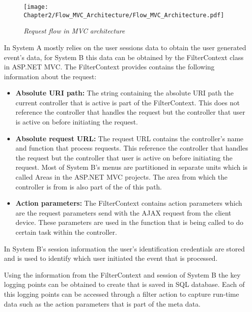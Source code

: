 \begin{figure}[!htb] %
	\centering %
	\texttt{[image: Chapter2/Flow\_MVC\_Architecture/Flow\_MVC\_Architecture.pdf]}
	\caption[Request flow in MVC architecture]
	{\textit{Request flow in MVC architecture \cite{Gu2010}}}\label{fig:ch2_Flow_MVC_Architecture}
\end{figure}

In  System A mostly relies on the user sessions data to obtain the user generated event's data, for System B this data can be obtained by the FilterContext class in ASP.NET MVC. The FilterContext provides contains the following information about the request:

\begin{itemize}
	\item \textbf{Absolute URI path:} The string containing the absolute URI path the current controller that is active is part of the FilterContext. This does not reference the controller that handles the request but the controller that user is active on before initiating the request. 
	\item \textbf{Absolute request URL:} The request URL contains the controller's name and function that process requests. This reference the controller that handles the request but the controller that user is active on before initiating the request. Most of System B's menus are partitioned in separate units which is called Areas in the ASP.NET MVC projects. The area from which the controller is from is also part of the of this path.
	\item \textbf{Action parameters:} The FilterContext contains action parameters which are the request parameters send with the AJAX request from the client device. These parameters are used in the function that is being called to do certain task within the controller.
\end{itemize}

In System B's session information the user's identification credentials are stored and is used to identify which user initiated the event that is processed.

\clearpage

Using the information from the FilterContext and session of System B the key logging points can be obtained to create  that is saved in SQL database. Each of this logging points can be accessed through a filter action to capture run-time data such as the action parameters that is part of the meta data.

